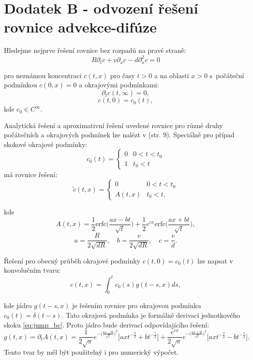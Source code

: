 \documentclass{article}
\def\prtl{\partial}
\begin{document}
\section*{Dodatek B - odvození řešení rovnice advekce-difúze}
Hledejme nejprve řešení rovnice bez rozpadů na pravé straně:
\begin{equation}
    \label{eq:no_decay_ad}
    R\prtl_t c + v \prtl_x c - d \prtl^2_x c = 0
\end{equation}

pro neznámou koncentraci $c(t, x)$ pro časy $t>0$ a na oblasti $x>0$ s~počáteční podmínkou $c(0, x) = 0$ a
okrajovými podmínkami:
\[
    \prtl_t c(t, \infty) = 0,
\]
\[
    c(t, 0) = c_0(t),
\]
kde $c_0 \in C^\infty$.

Analytická řešení a aproximativní řešení uvedené rovnice pro různé druhy počátečních
a okrajových podmínek lze nalézt v \cite{Genuchten1982} (str. 9). 
Speciálně pro případ skokové okrajové podmínky:
\begin{equation}
    \label{eq:jump_bc}
    c_0(t) = \left\{\begin{array}{ll}
         0 & 0 < t < t_0 \\
         1   & t_0 < t
    \end{array}\right. 
\end{equation}
má rovnice řešení:
\begin{equation}
    \label{eq:jump_sol}
    \tilde c(t, x) = 
    \left\{\begin{array}{ll}
         0                     & 0 < t < t_0 \\
         A(t,x)   & t_0 < t,
    \end{array}\right. 
\end{equation}

kde
\[
    A(t,x) = \frac12 \mathrm{erfc}\Big(\frac{ax-bt}{\sqrt t}\Big)
    + \frac12 e^{cx}\mathrm{erfc}\Big(\frac{ax+bt}{\sqrt t}\Big),
\]
\[
    a = \frac{R}{2\sqrt{dR}},\quad 
    b=\frac{v}{2\sqrt{dR}},\quad 
    c=\frac{v}{d}.
\]

Řešení pro obecný průběh okrajové podmínky $c(t,0) = c_0(t)$ lze napsat v konvolučním tvaru:
\[
    c(t,x) = \int_0^t c_0(s) g(t - s, x) ds,
\]

kde jádro $g(t - s, x)$ je řešením rovnice pro okrajovou podmínku $c_0(t) = \delta(t - s)$. 
Tato okrajová podmínka je formálně derivací jednotkového skoku \eqref{eq:jump_bc}. 
Proto jádro bude derivací odpovídajícího řešení:
\[
    g(t, x) = \prtl_t A(t, x) = 
    \frac{1}{2\sqrt{\pi}} 
    e^{-\big( \frac{ax-bt}{\sqrt{t}}\big)^2}
    \Big[ ax t^{-\frac32} + b t^{-\frac12}\Big]
    + \frac{e^{cx}}{2\sqrt{\pi}}  
    e^{-\big( \frac{ax+bt}{\sqrt{t}}\big)^2}
    \Big[ ax t^{-\frac32} - b t^{-\frac12}\Big].
\]
Tento tvar by měl být použitelný i pro numerický výpočet.
\end{document}
